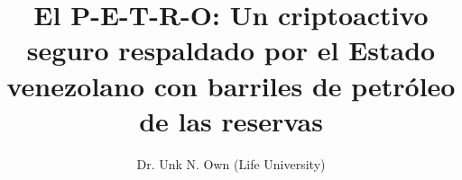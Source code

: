 \documentclass[spanish,letterpaper,11pt]{article}
\title{\bf El  P-E-T-R-O: Un criptoactivo seguro respaldado por el Estado venezolano con barriles de petróleo de las reservas}
\author{
     Dr. Unk N. Own (Life University)\\
}
\date{}
\begin{document}

\maketitle

\begin{abstract}



\end{abstract}

\setlength{\columnsep}{20pt}

\tableofcontents












\renewcommand{\appendixname}{Anexos}

\begin{appendices} %




%

\end{appendices}
\end{document}

